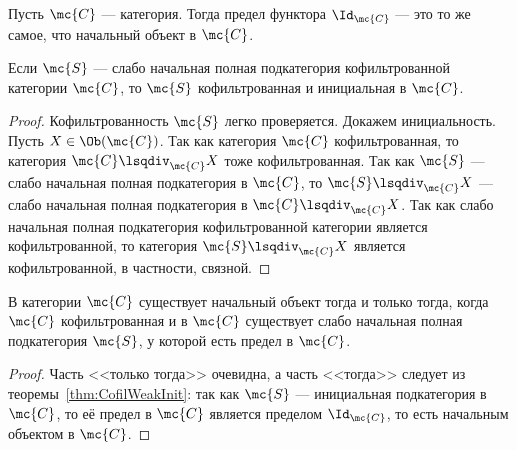 \documentclass[
	extrafontsizes,
	11pt,
	hyphens,
]{memoir}
\begin{document}
\begin{observation}
Пусть \(\mc{C}\) --- категория.%
\label{obs:InitLimOfId}
Тогда предел функтора \(\Id_{\mc{C}}\) --- это то же самое, что начальный объект в \(\mc{C}\).
\end{observation}

\begin{theorem}
Если \(\mc{S}\) --- слабо начальная полная подкатегория кофильтрованной категории \(\mc{C}\),%
\label{thm:CofilWeakInit}
то \(\mc{S}\) кофильтрованная и инициальная в \(\mc{C}\).
\end{theorem}

\begin{proof}
Кофильтрованность \(\mc{S}\) легко проверяется.
Докажем инициальность.
Пусть \(X \in \Ob(\mc{C})\).
Так как категория \(\mc{C}\) кофильтрованная, то категория \(\mc{C} \lsqdiv_{\mc{C}} X\) тоже кофильтрованная.
Так как \(\mc{S}\) --- слабо начальная полная подкатегория в \(\mc{C}\), то \(\mc{S} \lsqdiv_{\mc{C}} X\) --- слабо начальная полная подкатегория в \(\mc{C} \lsqdiv_{\mc{C}} X\).
Так как слабо начальная полная подкатегория кофильтрованной категории является кофильтрованной, то категория \(\mc{S} \lsqdiv_{\mc{C}} X\) является кофильтрованной, в частности, связной.
\end{proof}

\begin{corollary}
В категории \(\mc{C}\) существует начальный объект тогда и только тогда,%
\label{cor:FreydInitObj}
когда \(\mc{C}\) кофильтрованная и в \(\mc{C}\) существует слабо начальная полная подкатегория \(\mc{S}\), у которой есть предел в \(\mc{C}\).
\end{corollary}

\begin{proof}
Часть <<только тогда>> очевидна, а часть <<тогда>>
следует из теоремы~\ref{thm:CofilWeakInit}: так как \(\mc{S}\) --- инициальная подкатегория в \(\mc{C}\), то её предел в \(\mc{C}\) является пределом \(\Id_{\mc{C}}\), то есть начальным объектом в \(\mc{C}\).
\end{proof}

\end{document}
